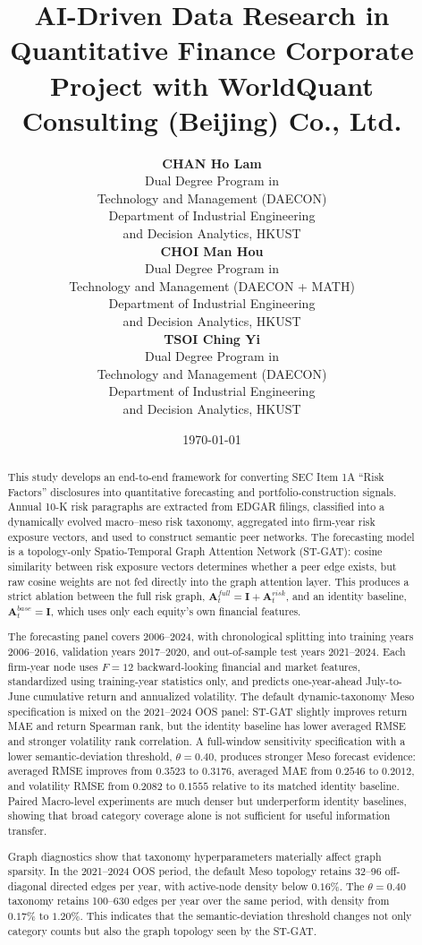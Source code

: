 \documentclass[11pt, a4paper]{article}
\title{\textbf{AI-Driven Data Research in Quantitative
Finance Corporate Project with WorldQuant
Consulting (Beijing) Co., Ltd.}}
\author{
  \begin{minipage}[t]{0.32\textwidth}
    \centering
    \textbf{CHAN Ho Lam} \\
    \footnotesize Dual Degree Program in \\ Technology and Management (DAECON)\\
    \footnotesize Department of Industrial Engineering \\ and Decision Analytics, HKUST
  \end{minipage}
  \hfill
  \begin{minipage}[t]{0.32\textwidth}
    \centering
    \textbf{CHOI Man Hou} \\
    \footnotesize Dual Degree Program in \\ Technology and Management (DAECON + MATH)\\
    \footnotesize Department of Industrial Engineering \\ and Decision Analytics, HKUST
  \end{minipage}
  \hfill
  \begin{minipage}[t]{0.32\textwidth}
    \centering
    \textbf{TSOI Ching Yi} \\
    \footnotesize Dual Degree Program in \\ Technology and Management (DAECON)\\
    \footnotesize Department of Industrial Engineering \\ and Decision Analytics, HKUST
  \end{minipage}
}
\date{\today}
\begin{document}
\maketitle

\begin{abstract}
    \noindent This study develops an end-to-end framework for converting SEC Item 1A ``Risk Factors'' disclosures into quantitative forecasting and portfolio-construction signals. Annual 10-K risk paragraphs are extracted from EDGAR filings, classified into a dynamically evolved macro--meso risk taxonomy, aggregated into firm-year risk exposure vectors, and used to construct semantic peer networks. The forecasting model is a topology-only Spatio-Temporal Graph Attention Network (ST-GAT): cosine similarity between risk exposure vectors determines whether a peer edge exists, but raw cosine weights are not fed directly into the graph attention layer. This produces a strict ablation between the full risk graph, $\mathbf{A}^{full}_{t}=\mathbf{I}+\mathbf{A}^{risk}_{t}$, and an identity baseline, $\mathbf{A}^{base}_{t}=\mathbf{I}$, which uses only each equity's own financial features.

    The forecasting panel covers 2006--2024, with chronological splitting into training years 2006--2016, validation years 2017--2020, and out-of-sample test years 2021--2024. Each firm-year node uses $F=12$ backward-looking financial and market features, standardized using training-year statistics only, and predicts one-year-ahead July-to-June cumulative return and annualized volatility. The default dynamic-taxonomy Meso specification is mixed on the 2021--2024 OOS panel: ST-GAT slightly improves return MAE and return Spearman rank, but the identity baseline has lower averaged RMSE and stronger volatility rank correlation. A full-window sensitivity specification with a lower semantic-deviation threshold, $\theta=0.40$, produces stronger Meso forecast evidence: averaged RMSE improves from $0.3523$ to $0.3176$, averaged MAE from $0.2546$ to $0.2012$, and volatility RMSE from $0.2082$ to $0.1555$ relative to its matched identity baseline. Paired Macro-level experiments are much denser but underperform identity baselines, showing that broad category coverage alone is not sufficient for useful information transfer.

    Graph diagnostics show that taxonomy hyperparameters materially affect graph sparsity. In the 2021--2024 OOS period, the default Meso topology retains 32--96 off-diagonal directed edges per year, with active-node density below $0.16\%$. The $\theta=0.40$ taxonomy retains 100--630 edges per year over the same period, with density from $0.17\%$ to $1.20\%$. This indicates that the semantic-deviation threshold changes not only category counts but also the graph topology seen by the ST-GAT.


\end{abstract}
\end{document}
